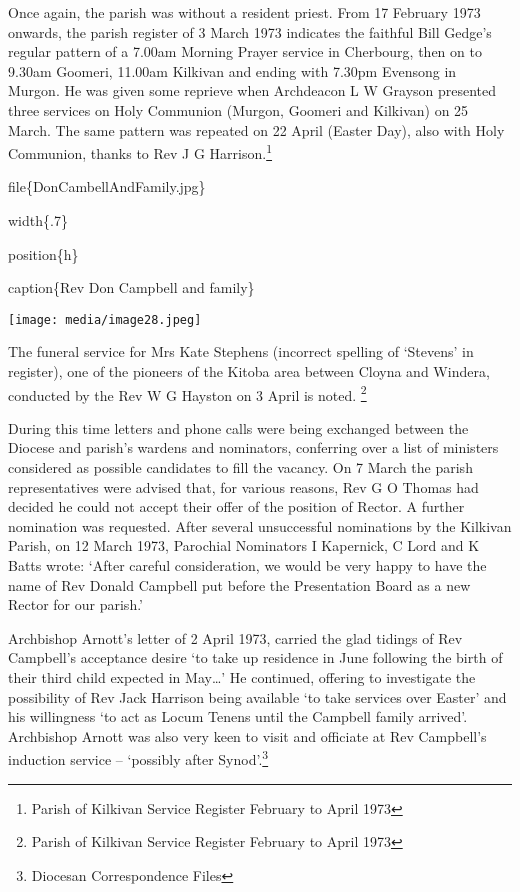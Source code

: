 Once again, the parish was without a resident priest. From 17 February
1973 onwards, the parish register of 3 March 1973 indicates the faithful
Bill Gedge's regular pattern of a 7.00am Morning Prayer service in
Cherbourg, then on to 9.30am Goomeri, 11.00am Kilkivan and ending with
7.30pm Evensong in Murgon. He was given some reprieve when Archdeacon L
W Grayson presented three services on Holy Communion (Murgon, Goomeri
and Kilkivan) on 25 March. The same pattern was repeated on 22 April
(Easter Day), also with Holy Communion, thanks to Rev J G
Harrison.\footnote{Parish of Kilkivan Service Register February to April
  1973}

file\{DonCambellAndFamily.jpg\}

width\{.7\}

position\{h\}

caption\{Rev Don Campbell and family\}

\texttt{[image: media/image28.jpeg]}

The funeral service for Mrs Kate Stephens (incorrect spelling of
`Stevens' in register), one of the pioneers of the Kitoba area between
Cloyna and Windera, conducted by the Rev W G Hayston on 3 April is
noted. \footnote{Parish of Kilkivan Service Register February to April
  1973}

During this time letters and phone calls were being exchanged between
the Diocese and parish's wardens and nominators, conferring over a list
of ministers considered as possible candidates to fill the vacancy. On 7
March the parish representatives were advised that, for various reasons,
Rev G O Thomas had decided he could not accept their offer of the
position of Rector. A further nomination was requested. After several
unsuccessful nominations by the Kilkivan Parish, on 12 March 1973,
Parochial Nominators I Kapernick, C Lord and K Batts wrote: `After
careful consideration, we would be very happy to have the name of Rev
Donald Campbell put before the Presentation Board as a new Rector for
our parish.'

Archbishop Arnott's letter of 2 April 1973, carried the glad tidings of
Rev Campbell's acceptance desire `to take up residence in June following
the birth of their third child expected in May\ldots' He continued,
offering to investigate the possibility of Rev Jack Harrison being
available `to take services over Easter' and his willingness `to act as
Locum Tenens until the Campbell family arrived'. Archbishop Arnott was
also very keen to visit and officiate at Rev Campbell's induction
service -- `possibly after Synod'.\footnote{Diocesan Correspondence
  Files}

